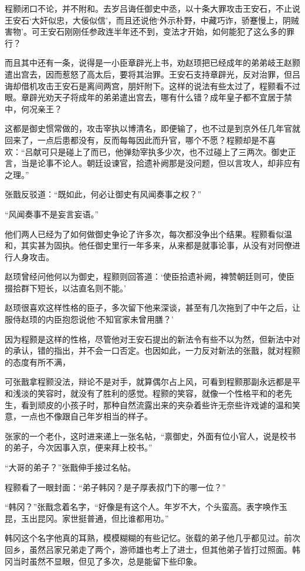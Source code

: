 程颢闭口不论，并不附和。去岁吕诲任御史中丞，以十条大罪攻击王安石，不止说王安石‘大奸似忠，大佞似信’，而且还说他‘外示朴野，中藏巧诈，骄蹇慢上，阴贼害物’。可王安石刚刚任参政连半年还不到，变法才开始，如何能犯了这么多的罪行？

而且其中还有一条，说得是一小臣章辟光上书，劝赵顼把已经成年的弟弟岐王赵颢遣出宫去，因而惹怒了高太后，要将其治罪。王安石支持章辟光，反对治罪，但吕诲却借机攻击王安石是离间两宫，朋奸附下。这样的说法有些太过了，程颢看不过眼。章辟光劝天子将成年的弟弟遣出宫去，哪有什么错？成年皇子都不宜居于禁中，何况亲王？

这都是御史惯常做的，攻击宰执以博清名，即便输了，也不过是到京外任几年官就回来了，一点后患都没有，反而每每因此而升官，哪个不愿？程颢却是不喜欢：“吕献可只是碰上了而已，他弹劾宰执多少次，也不过碰上了三两次。御史正言，当是论事不论人。朝廷设谏官，拾遗补阙那是没问题，但以言攻人，却非应有之理。”

张戬反驳道：“既如此，何必让御史有风闻奏事之权？”

“风闻奏事不是妄言妄语。”

他们两人已经为了如何做御史争论了许多次，每次都没争出个结果。程颢看似温和，其实甚为固执。他任御史里行一年多来，从来都是就事论事，从没有对同僚进行人身攻击。

赵顼曾经问他何以为御史，程颢则回答道：‘使臣拾遗补阙，裨赞朝廷则可，使臣掇拾群下短长，以沽直名则不能。’

赵顼很喜欢这样性格的臣子，多次留下他来深谈，甚至有几次拖到了中午之后，让服侍赵顼的内臣抱怨说他‘不知官家未曾用膳？’

因为程颢是这样的性格，尽管他对王安石提出的新法令有些不以为然，但新法中对的承认，错的指出，并不会一口否定。也因如此，一力反对新法的张戬，就对程颢的态度有所不满，

可张戬拿程颢没法，辩论不是对手，就算偶尔占上风，可看到程颢那副永远都是平和浅淡的笑容时，就没有了胜利的感觉。程颢的笑容，就像一个性格平和的老先生，看到顽皮的小孩子时，那种自然流露出来的夹杂着些许无奈些许戏谑的温和笑意，一点也不像跟自己年岁相当的样子。

张家的一个老仆，这时进来递上一张名帖，“禀御史，外面有位小官人，说是校书的弟子，今次因事入京，便来拜上校书。”

“大哥的弟子？”张戬伸手接过名帖。

程颢看了一眼封面：“弟子韩冈？是子厚表叔门下的哪一位？”

“韩冈？”张戬念着名字，“好像是有这个人。年岁不大，个头蛮高。表字唤作玉昆，玉出昆冈。家世挺普通，但比谁都用功。”

韩冈这个名字他真的耳熟，模模糊糊的有些记忆。张载的弟子他几乎都见过。前次回乡，虽然吕家兄弟走了两个，游师雄也考上了进士，但其他弟子皆打过照面。韩冈当时虽然不显眼，但见了多次，总是能留下些印象。

